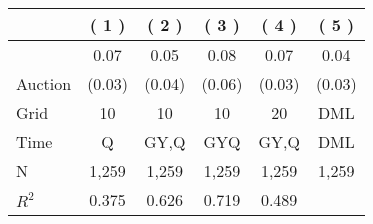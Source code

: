 
\begin{tabular}{lccccc}
\toprule
 & ( 1 ) & ( 2 ) & ( 3 ) & ( 4 ) & ( 5 )\\
\midrule
 & 0.07 & 0.05 & 0.08 & 0.07 & 0.04\\

\multirow{-2}{*}{\raggedright\arraybackslash Auction} & (0.03) & (0.04) & (0.06) & (0.03) & (0.03)\\

\midrule
Grid & 10 & 10 & 10 & 20 & DML\\

Time & Q & GY,Q & GYQ & GY,Q & DML\\

N & 1,259 & 1,259 & 1,259 & 1,259 & 1,259\\

$R^2$ & 0.375 & 0.626 & 0.719 & 0.489 & \\
\bottomrule
\end{tabular}
